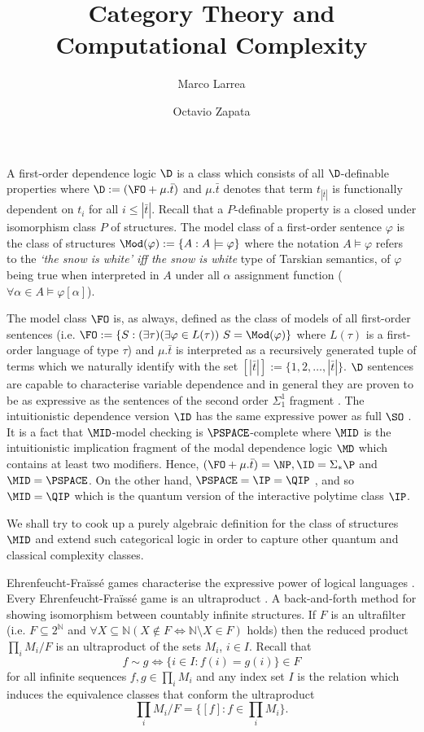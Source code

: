 

\title{Category Theory and \\ Computational Complexity}
\author{Marco Larrea \and Octavio Zapata}


\maketitle
A first-order dependence logic $\D$ is a class which consists of all $\D$-definable properties where $\D := (\FO + \mu.\bar{t})$ and $\mu.\bar{t}$ denotes that term $t_{|\bar{t}|}$ is functionally dependent on $t_{i}$ for all $i\leq |\bar{t}|$. Recall that a $P$-definable property is a closed under isomorphism class $P$ of structures. The model class of a first-order sentence $\varphi$ is the class of structures $\Mod(\varphi):=\{A:A\models\varphi\}$ where the notation $A\models\varphi$ refers to the \emph{`the snow is white' iff the snow is white} type of Tarskian semantics, of $\varphi$ being true when interpreted in $A$ under all $\alpha$ assignment function ($\forall\alpha\in A\models\varphi[\alpha]$). 

The model class $\FO$ is, as always, defined as the class of models of all first-order sentences (i.e. $\FO:= \{S:(\exists\tau)(\exists\varphi\in L(\tau))\ S=\Mod(\varphi)\}$ where $L(\tau)$ is a first-order language of type $\tau$) and $\mu.\bar{t}$ is interpreted as a recursively generated tuple of terms which we naturally identify with the set $[|\bar{t}|] := \{1,2,\dots,|\bar{t}|\}$. $\D$ sentences are capable to characterise variable dependence and in general they are proven to be as expressive as the sentences of the second order $\Sigma_1^1$ fragment \cite{dep}. The intuitionistic dependence version $\ID$ has the same expressive power as full $\SO$ \cite{dep}. It is a fact that $\MID$-model checking is $\PSPACE$-complete \cite{dep} where $\MID$ is the intuitionistic implication fragment of the modal dependence logic $\MD$ which contains at least two modifiers. Hence, $(\FO + \mu.\bar{t}) = \NP, \ID = \Sigma_{\ast}\P$ and $\MID = \PSPACE$.  On the other hand, $\PSPACE = \IP = \QIP$ \cite{qip}, and so $\MID = \QIP$ which is the quantum version of the interactive polytime class $\IP$.

We shall try to cook up a purely algebraic definition for the class of structures $\MID$ and extend such categorical logic in order to capture other quantum and classical complexity classes. 

Ehrenfeucht-Fra\"iss\'e games characterise the expressive power of logical languages \cite{ams}. Every Ehrenfeucht-Fra\"iss\'e game is an ultraproduct \cite{models}. A back-and-forth method for showing isomorphism between countably infinite structures. If $F$ is an ultrafilter (i.e. $F\subseteq 2^{\mathbb{N}}$ and $\forall X\subseteq\mathbb{N} (X\notin F \Leftrightarrow \mathbb{N}\setminus X\in F)$ holds) then the reduced product $\prod_{i}M_i / F$ is an ultraproduct of the sets $M_i$, $i\in I$. Recall that \[f\sim g \Leftrightarrow \{i\in I : f(i) = g(i)\}\in F\] for all infinite sequences $f,g\in\prod_i M_i$ and any index set $I$ is the relation which induces the equivalence classes that conform the ultraproduct \[\prod_{i}M_i / F = \{[f]:f\in\prod_i M_i\}.\] 

